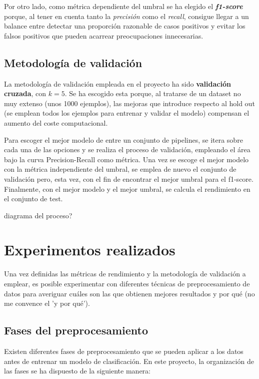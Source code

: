\documentclass{article}
\begin{document}
Por otro lado, como métrica dependiente del umbral se ha elegido el \textit{\textbf{f1-score}} porque, al tener en cuenta tanto la \textit{precisión} como el \textit{recall}, consigue llegar a un balance entre detectar una proporción razonable de casos positivos y evitar los falsos positivos que pueden acarrear preocupaciones innecesarias.

\subsection{Metodología de validación}

La metodología de validación empleada en el proyecto ha sido \textbf{validación cruzada}, con $k = 5$. Se ha escogido esta porque, al tratarse de un dataset no muy extenso (unos 1000 ejemplos), las mejoras que introduce respecto al hold out (se emplean todos los ejemplos para entrenar y validar el modelo) compensan el aumento del coste computacional.\newline

Para escoger el mejor modelo de entre un conjunto de pipelines, se itera sobre cada una de las opciones y se realiza el proceso de validación, empleando el área bajo la curva Precision-Recall como métrica. Una vez se escoge el mejor modelo con la métrica independiente del umbral, se emplea de nuevo el conjunto de validación pero, esta vez, con el fin de encontrar el mejor umbral para el f1-score. Finalmente, con el mejor modelo y el mejor umbral, se calcula el rendimiento en el conjunto de test.\newline

diagrama del proceso?

\section{Experimentos realizados}

Una vez definidas las métricas de rendimiento y la metodología de validación a emplear, es posible experimentar con diferentes técnicas
de preprocesamiento de datos para averiguar cuáles son las que obtienen mejores resultados y por qué (no me convence el 'y por qué').

\subsection{Fases del preprocesamiento}

Existen diferentes fases de preprocesamiento que se pueden aplicar a los datos antes de entrenar un modelo de clasificación. En este
proyecto, la organización de las fases se ha dispuesto de la siguiente manera:
\end{document}
